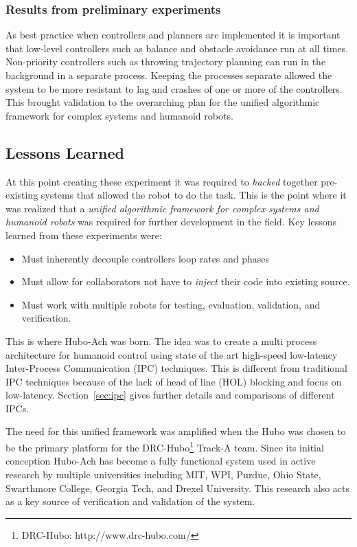 \subsubsection{Results from preliminary experiments}
As best practice when controllers and planners are implemented it is important that low-level controllers such as balance and obstacle avoidance run at all times\cite{lofaroRAM2013}. 
Non-priority controllers such as throwing trajectory planning can run in the background in a separate process.
Keeping the processes separate allowed the system to be more resistant to lag and crashes of one or more of the controllers.
This brought validation to the overarching plan for the unified algorithmic framework for complex systems and humanoid robots.




\subsection{Lessons Learned}

At this point creating these experiment it was required to \textit{hacked} together pre-existing systems that allowed the robot to do the task.
This is the point where it was realized that a \textit{unified algorithmic framework for complex systems and humanoid robots} was required for further development in the field.
Key lessons learned from these experiments were:
\begin{itemize}
\item Must inherently decouple controllers loop rates and phases
\item Must allow for collaborators not have to \textit{inject} their code into existing source.
\item Must work with multiple robots for testing, evaluation, validation, and verification.
\end{itemize}

\noindent This is where Hubo-Ach was born.
The idea was to create a multi process architecture for humanoid control using state of the art high-speed low-latency Inter-Process Communication (IPC) techniques\cite{lofaroRAM2013}.
This is different from traditional IPC techniques because of the lack of head of line (HOL) blocking and focus on low-latency.
Section~\ref{sec:ipc} gives further details and comparisons of different IPCs.


The need for this unified framework was amplified when the Hubo was chosen to be the primary platform for the DRC-Hubo\footnote{DRC-Hubo: http://www.drc-hubo.com/} Track-A team.
Since its initial conception Hubo-Ach has become a fully functional system used in active research by multiple universities including MIT, WPI, Purdue, Ohio State, Swarthmore College, Georgia Tech, and Drexel University\cite{lofaroTePRA2013HuboAch,lofaroTePRA2013Valve}.
This research also acts as a key source of verification and validation of the system.

